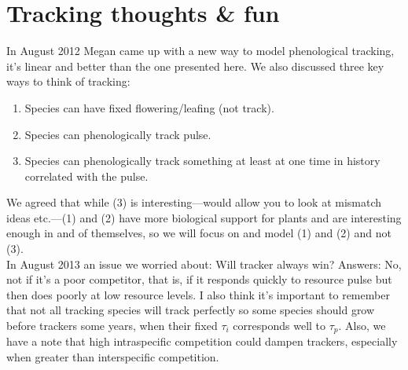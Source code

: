 \documentclass[11pt,a4paper,oneside]{article}
\begin{document}
\section{Tracking thoughts \& fun}
In August 2012 Megan came up with a new way to model phenological tracking, it's linear and better than the one presented here. We also discussed three key ways to think of tracking:
\begin{enumerate}
\item Species can have fixed flowering/leafing (not track).
\item Species can phenologically track pulse.
\item Species can phenologically track something at least at one time in history correlated with the pulse.
\end{enumerate}
We agreed that while (3) is interesting---would allow you to look at mismatch ideas etc.---(1) and (2) have more biological support for plants and are interesting enough in and of themselves, so we will focus on and model (1) and (2) and not (3).\\

\noindent In August 2013 an issue we worried about: Will tracker always win? Answers: No, not if it's a poor competitor, that is, if it responds quickly to resource pulse but then does poorly at low resource levels. I also think it's important to remember that not all tracking species will track perfectly so some species should grow before trackers some years, when their fixed \(\tau_{i}\) corresponds well to \(\tau_{p}\). Also, we have a note that high intraspecific competition could dampen trackers, especially when greater than interspecific competition.\\
\end{document}
